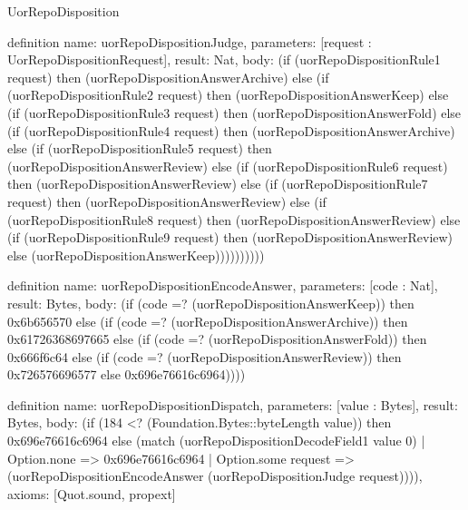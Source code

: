 \begin{lexlean}{UorRepoDisposition}
\begin{semanticmodule}
definition{
  name: uorRepoDispositionJudge,
  parameters: [request : UorRepoDispositionRequest],
  result: Nat,
  body: (if (uorRepoDispositionRule1 request) then (uorRepoDispositionAnswerArchive) else (if (uorRepoDispositionRule2 request) then (uorRepoDispositionAnswerKeep) else (if (uorRepoDispositionRule3 request) then (uorRepoDispositionAnswerFold) else (if (uorRepoDispositionRule4 request) then (uorRepoDispositionAnswerArchive) else (if (uorRepoDispositionRule5 request) then (uorRepoDispositionAnswerReview) else (if (uorRepoDispositionRule6 request) then (uorRepoDispositionAnswerReview) else (if (uorRepoDispositionRule7 request) then (uorRepoDispositionAnswerReview) else (if (uorRepoDispositionRule8 request) then (uorRepoDispositionAnswerReview) else (if (uorRepoDispositionRule9 request) then (uorRepoDispositionAnswerReview) else (uorRepoDispositionAnswerKeep))))))))))
}

definition{
  name: uorRepoDispositionEncodeAnswer,
  parameters: [code : Nat],
  result: Bytes,
  body: (if (code =? (uorRepoDispositionAnswerKeep)) then 0x6b656570 else (if (code =? (uorRepoDispositionAnswerArchive)) then 0x61726368697665 else (if (code =? (uorRepoDispositionAnswerFold)) then 0x666f6c64 else (if (code =? (uorRepoDispositionAnswerReview)) then 0x726576696577 else 0x696e76616c6964))))
}

definition{
  name: uorRepoDispositionDispatch,
  parameters: [value : Bytes],
  result: Bytes,
  body: (if (184 <? (Foundation.Bytes::byteLength value)) then 0x696e76616c6964 else (match (uorRepoDispositionDecodeField1 value 0)
    | Option.none => 0x696e76616c6964
    | Option.some request => (uorRepoDispositionEncodeAnswer (uorRepoDispositionJudge request)))),
  axioms: [Quot.sound, propext]
}
\end{semanticmodule}
\end{lexlean}
